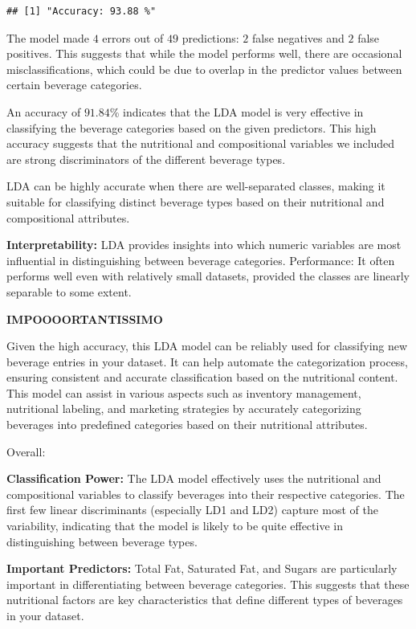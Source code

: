\documentclass[
]{article}
\begin{document}
\begin{verbatim}
## [1] "Accuracy: 93.88 %"
\end{verbatim}

The model made \(4\) errors out of \(49\) predictions: \(2\) false
negatives and \(2\) false positives. This suggests that while the model
performs well, there are occasional misclassifications, which could be
due to overlap in the predictor values between certain beverage
categories.

An accuracy of \(91.84\)\% indicates that the LDA model is very
effective in classifying the beverage categories based on the given
predictors. This high accuracy suggests that the nutritional and
compositional variables we included are strong discriminators of the
different beverage types.

LDA can be highly accurate when there are well-separated classes, making
it suitable for classifying distinct beverage types based on their
nutritional and compositional attributes.

\textbf{Interpretability:} LDA provides insights into which numeric
variables are most influential in distinguishing between beverage
categories. Performance: It often performs well even with relatively
small datasets, provided the classes are linearly separable to some
extent.

\textbf{IMPOOOORTANTISSIMO}

Given the high accuracy, this LDA model can be reliably used for
classifying new beverage entries in your dataset. It can help automate
the categorization process, ensuring consistent and accurate
classification based on the nutritional content. This model can assist
in various aspects such as inventory management, nutritional labeling,
and marketing strategies by accurately categorizing beverages into
predefined categories based on their nutritional attributes.

Overall:

\textbf{Classification Power:} The LDA model effectively uses the
nutritional and compositional variables to classify beverages into their
respective categories. The first few linear discriminants (especially
LD1 and LD2) capture most of the variability, indicating that the model
is likely to be quite effective in distinguishing between beverage
types.

\textbf{Important Predictors:} Total Fat, Saturated Fat, and Sugars are
particularly important in differentiating between beverage categories.
This suggests that these nutritional factors are key characteristics
that define different types of beverages in your dataset.
\end{document}

